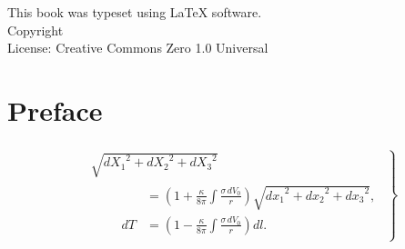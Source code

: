 \documentclass{book}
\makeatletter
\newcommand{\booklicense}{Creative Commons Zero 1.0 Universal}
\newcommand{\bookauthor}{\@author}
\makeatother
\begin{document}
\thispagestyle{empty}

\begin{flushleft}
\vspace*{\fill}
This book was typeset using \LaTeX{} software.\\
\vspace{\fill}
Copyright \textcopyright{} \the\year{}  \bookauthor\\
License: \booklicense
\end{flushleft}

\addtocounter{page}{2}

\chapter*{Preface}
\paragraph{}
\[
\left.
\begin{aligned}
  &\sqrt{{dX_{1}}^{2} + {dX_{2}}^{2} + {dX_{3}}^{2}} \\
  &\qquad
  \begin{aligned}
  &= \left(1 + \frac{\kappa}{8\pi} \int \frac{\sigma\, dV_{0}}{r}\right)
     \sqrt{{dx_{1}}^{2} + {dx_{2}}^{2} + {dx_{3}}^{2}}, \\
dT &= \left(1 - \frac{\kappa}{8\pi} \int \frac{\sigma\, dV_{0}}{r}\right) dl.
\end{aligned}
\end{aligned}
\right\}
\]


\setcounter{tocdepth}{4}
\setcounter{secnumdepth}{4}
\tableofcontents

\mainmatter
\end{document}
